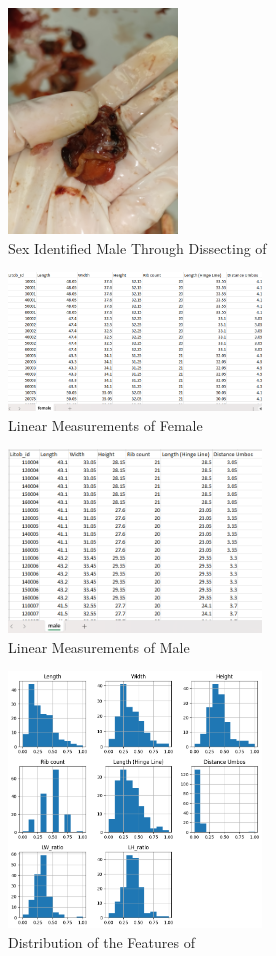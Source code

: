 \begin{figure}[!htbp]
	\centering
	\includegraphics[width=0.4\textwidth, angle=90]{figures/dissecting male.jpg}
	\caption{Sex Identified Male Through Dissecting of \Tegillarcagranosa}
\end{figure}

\begin{figure}[!htbp]
	\centering
	\includegraphics[width=0.6\textwidth]{figures/female_dataset.png}
	\caption{Linear Measurements of Female \Tegillarcagranosa}
\end{figure}

\begin{figure}[!htbp]
	\centering
	\includegraphics[width=0.6\textwidth]{figures/male_dataset.png}
	\caption{Linear Measurements of Male \Tegillarcagranosa}
\end{figure}

\begin{figure}[!htbp]
	\centering
	\includegraphics[width=0.6\textwidth]{figures/sample_distribution.png}
	\caption{Distribution of the Features of \Tegillarcagranosa}
\end{figure}


